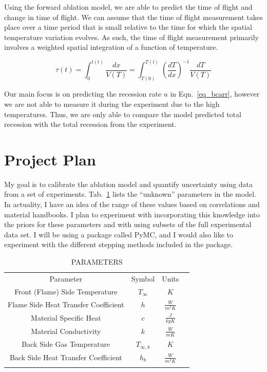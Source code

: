 \documentclass[11pt]{article}
\begin{document}
Using the forward ablation model, we are able to predict the time of flight and change in time of flight. We can assume that the time of flight measurement takes place over a time period that is small relative to the time for which the spatial temperature variation evolves. As such, the time of flight measurement primarily involves a weighted spatial integration of a function of temperature.

\begin{equation}
\tau(t) = \int_{0}^{l(t)} \frac{dx}{V(T)} = \int_{T(0)}^{T(l)} (\frac{dT}{dx})^{-1} \frac{dT}{V(T)}
\label{eq_tof}
\end{equation}

Our main focus is on predicting the recession rate $u$ in Eqn.~\ref{eq_bcarr}, however we are not able to measure it during the experiment due to the high temperatures. Thus, we are only able to compare the model predicted total recession with the total recession from the experiment.

\section{Project Plan}

My goal is to calibrate the ablation model and quantify uncertainty using data from a set of experiments. Tab.~\ref{tab_para} lists the ``unknown'' parameters in the model. In actuality, I have an idea of the range of these values based on correlations and material handbooks. I plan to experiment with incorporating this knowledge into the priors for these parameters and with using subsets of the full experimental data set. I will be using a package called PyMC, and I would also like to experiment with the different stepping methods included in the package.

\begin{table}[h]
\caption{PARAMETERS}
\begin{center}
  \begin{tabular}{cccc}
    \hline\noalign{\smallskip}
    Parameter & Symbol & Units \\
    \noalign{\smallskip}\hline\noalign{\smallskip}
    Front (Flame) Side Temperature & $T_\infty$ & $K$\\
    Flame Side Heat Transfer Coefficient & $h$ & $\frac{W}{m^2K}$\\ 
    Material Specific Heat & $c$ & $\frac{J}{kgK}$\\ 
    Material Conductivity & $k$ & $\frac{W}{mK}$\\ 
    Back Side Gas Temperature & $T_{\infty,b}$ & $K$\\ 
    Back Side Heat Transfer Coefficient & $h_b$ & $\frac{W}{m^2K}$\\ 
    \noalign{\smallskip}\hline
  \end{tabular}
\end{center}
\label{tab_para}
\end{table}



\end{document}
